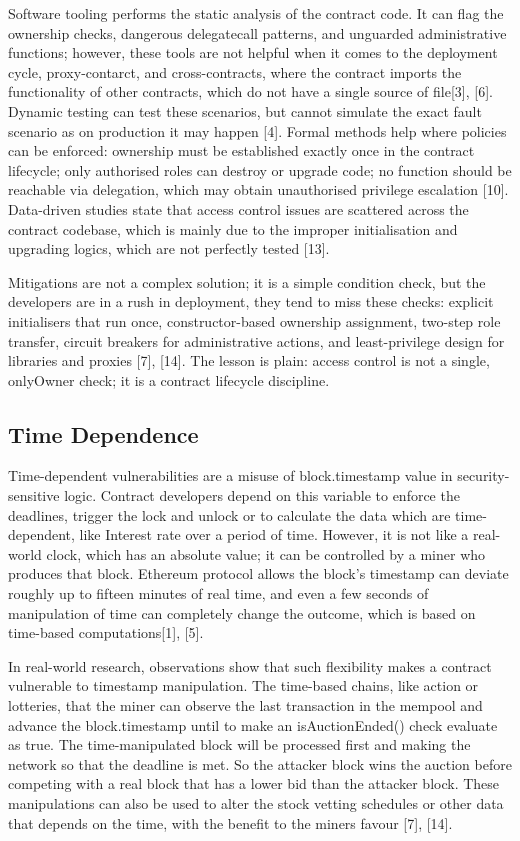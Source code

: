 \documentclass[conference]{IEEEtran}
\begin{document}
Software tooling performs the static analysis of the contract code. It can flag the ownership checks, dangerous delegatecall patterns, and unguarded administrative functions; however, these tools are not helpful when it comes to the deployment cycle, proxy-contarct, and cross-contracts, where the contract imports the functionality of other contracts, which do not have a single source of file[3], [6]. Dynamic testing can test these scenarios, but cannot simulate the exact fault scenario as on production it may happen [4]. Formal methods help where policies can be enforced: ownership must be established exactly once in the contract lifecycle; only authorised roles can destroy or upgrade code; no function should be reachable via delegation, which may obtain unauthorised privilege escalation [10]. Data-driven studies state that access control issues are scattered across the contract codebase, which is mainly due to the improper initialisation and upgrading logics, which are not perfectly tested [13].

Mitigations are not a complex solution; it is a simple condition check, but the developers are in a rush in deployment, they tend to miss these checks: explicit initialisers that run once, constructor-based ownership assignment, two-step role transfer, circuit breakers for administrative actions, and least-privilege design for libraries and proxies [7], [14]. The lesson is plain: access control is not a single, onlyOwner check; it is a contract lifecycle discipline.

\subsection{Time Dependence}
Time-dependent vulnerabilities are a misuse of block.timestamp value in security-sensitive logic. Contract developers depend on this variable to enforce the deadlines, trigger the lock and unlock or to calculate the data which are time-dependent, like Interest rate over a period of time. However, it is not like a real-world clock, which has an absolute value; it can be controlled by a miner who produces that block. Ethereum protocol  allows the block’s timestamp can deviate roughly up to fifteen minutes of real time, and even a few seconds of manipulation of time can completely change the outcome, which is based on time-based computations[1], [5].

In real-world research, observations show that such flexibility makes a contract vulnerable to timestamp manipulation. The time-based chains, like action or lotteries, that the miner can observe the last transaction in the mempool and advance the block.timestamp until to make an isAuctionEnded() check evaluate as true. The time-manipulated block will be processed first and making the network so that the deadline is met. So the attacker block wins the auction before competing with a real block that has a lower bid than the attacker block. These manipulations can also be used to alter the stock vetting schedules or other data that depends on the time, with the benefit to the miners favour [7], [14].
\end{document}
